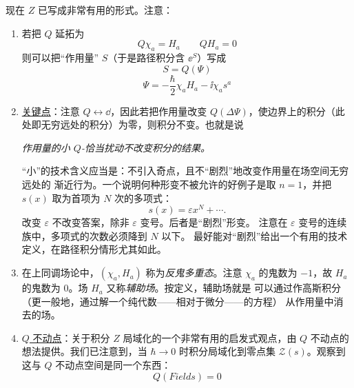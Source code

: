 现在 $Z$ 已写成非常有用的形式。注意：

\begin{enumerate}
\item 若把 $Q$ 延拓为
  \begin{equation}
  Q\chi_a = H_a \qquad QH_a = 0
  \tag{3.24}
  \end{equation}
  则可以把“作用量” $S$（于是路径积分含 $\ee^{S}$）写成
  \begin{equation}
  S = Q(\Psi)
  \tag{3.25}
  \end{equation}
  \begin{equation}
  \Psi = -\frac{\hbar}{2}\chi_aH_a-\ii\chi_a s^a
  \tag{3.26}
  \end{equation}
\item \underline{关键点}：注意 $Q\leftrightarrow \dd$，因此若把作用量改变
  $Q(\Delta\Psi)$，使边界上的积分（此处即无穷远处的积分）为零，则积分不变。也就是说

  \noindent\emph{作用量的小 $Q$-恰当扰动不改变积分的结果。}

  “小”的技术含义应当是：不引入奇点，且不“剧烈”地改变作用量在场空间无穷远处的
  渐近行为。一个说明何种形变不被允许的好例子是取 $n=1$，并把 $s(x)$ 取为首项为
  $N$ 次的多项式：
  \begin{equation}
  s(x) = \varepsilon x^N+\cdots.
  \tag{3.27}
  \end{equation}
  改变 $\varepsilon$ 不改变答案，除非 $\varepsilon$ 变号。后者是“剧烈”形变。
  注意在 $\varepsilon$ 变号的连续族中，多项式的次数必须降到 $N$ 以下。
  最好能对“剧烈”给出一个有用的技术定义，在路径积分情形尤其如此。
\item 在上同调场论中，$(\chi_a,H_a)$ 称为\emph{反鬼多重态}。注意 $\chi_a$ 的鬼数为
  $-1$，故 $H_a$ 的鬼数为 $0$。场 $H_a$ 又称\emph{辅助场}。按定义，辅助场就是
  可以通过作高斯积分（更一般地，通过解一个纯代数——相对于微分——的方程）
  从作用量中消去的场。
\item \underline{$Q$ 不动点}：关于积分 $Z$ 局域化的一个非常有用的启发式观点，由
  $Q$ 不动点的想法提供。我们已注意到，当 $\hbar\to0$ 时积分局域化到零点集
  $\mathcal Z(s)$。观察到这与 $Q$ 不动点空间是同一个东西：
  \begin{equation}
  Q(\mathit{Fields}) = 0
  \tag{3.28}
  \end{equation}
\end{enumerate}


